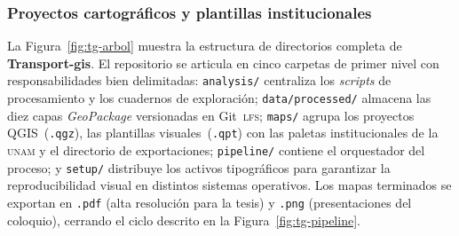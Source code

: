 \subsubsection{Proyectos cartográficos y plantillas institucionales}
\label{subsubsec:tg-proyectos}

La Figura~\ref{fig:tg-arbol} muestra la estructura de directorios completa de \textbf{Transport-gis}. El repositorio se articula
en cinco carpetas de primer nivel con responsabilidades bien delimitadas: \texttt{analysis/} centraliza los \textit{scripts} de
procesamiento y los cuadernos de exploración; \texttt{data/processed/} almacena las diez capas \textit{GeoPackage} versionadas en
Git~\textsc{lfs}; \texttt{maps/} agrupa los proyectos QGIS~(\texttt{.qgz}), las plantillas visuales~(\texttt{.qpt}) con las paletas
institucionales de la \textsc{unam} y el directorio de exportaciones; \texttt{pipeline/} contiene el orquestador del proceso; y
\texttt{setup/} distribuye los activos tipográficos para garantizar la reproducibilidad visual en distintos sistemas operativos.
Los mapas terminados se exportan en \texttt{.pdf} (alta resolución para la tesis) y \texttt{.png} (presentaciones del coloquio),
cerrando el ciclo descrito en la Figura~\ref{fig:tg-pipeline}.

